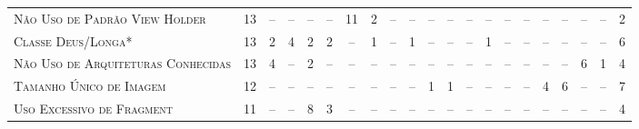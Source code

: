 \begin{table*}
\begin{tabular}{@{}p{3.5cm}p{0.3cm}p{.2cm}p{.2cm}p{.2cm}p{.2cm}p{.2cm}p{.2cm}p{.2cm}p{.2cm}p{.2cm}p{.4cm}p{.4cm}p{.4cm}p{.4cm}p{.4cm}p{.4cm}p{.4cm}p{.4cm}p{.4cm}p{0.2cm}@{}}
\textsc{Não Uso de Padrão View Holder}     	& \multicolumn{1}{c}{13} 	& \multicolumn{1}{c}{--} 	& \multicolumn{1}{c}{--} 	& \multicolumn{1}{c}{--} 	& \multicolumn{1}{c}{--} 	& \multicolumn{1}{c}{11} 	& \multicolumn{1}{c}{2} 	& \multicolumn{1}{c}{--} 	& \multicolumn{1}{c}{--} 	& \multicolumn{1}{c}{--} 	& \multicolumn{1}{c}{--} 	& \multicolumn{1}{c}{--} 	& \multicolumn{1}{c}{--} 	& \multicolumn{1}{c}{--} 	& \multicolumn{1}{c}{--} 	& \multicolumn{1}{c}{--}	& \multicolumn{1}{c}{--} 	& \multicolumn{1}{c}{--} 	& \multicolumn{1}{c}{--} 	& \multicolumn{1}{c}{2} \\
\textsc{Classe Deus/Longa*}                	& \multicolumn{1}{c}{13} 	& \multicolumn{1}{c}{2} 	& \multicolumn{1}{c}{4} 	& \multicolumn{1}{c}{2}	 	& \multicolumn{1}{c}{2} 	& \multicolumn{1}{c}{--} 	& \multicolumn{1}{c}{1} 	& \multicolumn{1}{c}{--} 	& \multicolumn{1}{c}{1} 	& \multicolumn{1}{c}{--} 	& \multicolumn{1}{c}{--} 	& \multicolumn{1}{c}{--} 	& \multicolumn{1}{c}{1} 	& \multicolumn{1}{c}{--} 	& \multicolumn{1}{c}{--} 	& \multicolumn{1}{c}{--}	& \multicolumn{1}{c}{--} 	& \multicolumn{1}{c}{--} 	& \multicolumn{1}{c}{--} 	& \multicolumn{1}{c}{6} \\
\textsc{Não Uso de Arquiteturas Conhecidas}	& \multicolumn{1}{c}{13} 	& \multicolumn{1}{c}{4} 	& \multicolumn{1}{c}{--} 	& \multicolumn{1}{c}{2}	 	& \multicolumn{1}{c}{--} 	& \multicolumn{1}{c}{--} 	& \multicolumn{1}{c}{--} 	& \multicolumn{1}{c}{--} 	& \multicolumn{1}{c}{--} 	& \multicolumn{1}{c}{--} 	& \multicolumn{1}{c}{--} 	& \multicolumn{1}{c}{--} 	& \multicolumn{1}{c}{--} 	& \multicolumn{1}{c}{--} 	& \multicolumn{1}{c}{--} 	& \multicolumn{1}{c}{--}	& \multicolumn{1}{c}{--} 	& \multicolumn{1}{c}{6} 	& \multicolumn{1}{c}{1} 	& \multicolumn{1}{c}{4} \\
\textsc{Tamanho Único de Imagem}           	& \multicolumn{1}{c}{12} 	& \multicolumn{1}{c}{--} 	& \multicolumn{1}{c}{--} 	& \multicolumn{1}{c}{--} 	& \multicolumn{1}{c}{--} 	& \multicolumn{1}{c}{--} 	& \multicolumn{1}{c}{--} 	& \multicolumn{1}{c}{--} 	& \multicolumn{1}{c}{--} 	& \multicolumn{1}{c}{1} 	& \multicolumn{1}{c}{1} 	& \multicolumn{1}{c}{--} 	& \multicolumn{1}{c}{--} 	& \multicolumn{1}{c}{--} 	& \multicolumn{1}{c}{--} 	& \multicolumn{1}{c}{4}		& \multicolumn{1}{c}{6} 	& \multicolumn{1}{c}{--} 	& \multicolumn{1}{c}{--} 	& \multicolumn{1}{c}{7} \\
\textsc{Uso Excessivo de Fragment}         	& \multicolumn{1}{c}{11} 	& \multicolumn{1}{c}{--} 	& \multicolumn{1}{c}{--} 	& \multicolumn{1}{c}{8}	 	& \multicolumn{1}{c}{3} 	& \multicolumn{1}{c}{--} 	& \multicolumn{1}{c}{--} 	& \multicolumn{1}{c}{--} 	& \multicolumn{1}{c}{--} 	& \multicolumn{1}{c}{--} 	& \multicolumn{1}{c}{--} 	& \multicolumn{1}{c}{--} 	& \multicolumn{1}{c}{--} 	& \multicolumn{1}{c}{--} 	& \multicolumn{1}{c}{--} 	& \multicolumn{1}{c}{--}	& \multicolumn{1}{c}{--} 	& \multicolumn{1}{c}{--} 	& \multicolumn{1}{c}{--} 	& \multicolumn{1}{c}{4} \\

\end{tabular}
\end{table*}
